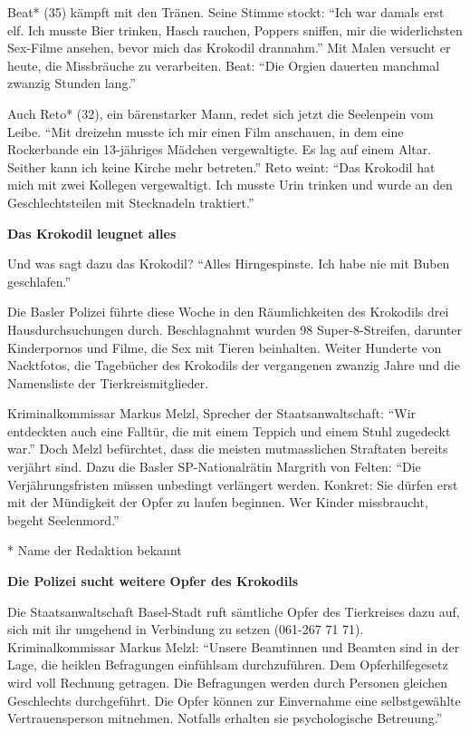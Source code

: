 Beat* (35) kämpft mit den Tränen. Seine Stimme stockt: ``Ich war damals
erst elf. Ich musste Bier trinken, Hasch rauchen, Poppers sniffen, mir
die widerlichsten Sex-Filme ansehen, bevor mich das Krokodil drannahm.''
Mit Malen versucht er heute, die Missbräuche zu verarbeiten. Beat: ``Die
Orgien dauerten manchmal zwanzig Stunden lang.''

Auch Reto* (32), ein bärenstarker Mann, redet sich jetzt die Seelenpein
vom Leibe. ``Mit dreizehn musste ich mir einen Film anschauen, in dem
eine Rockerbande ein 13-jähriges Mädchen vergewaltigte. Es lag auf einem
Altar. Seither kann ich keine Kirche mehr betreten.'' Reto weint: ``Das
Krokodil hat mich mit zwei Kollegen vergewaltigt. Ich musste Urin
trinken und wurde an den Geschlechtsteilen mit Stecknadeln traktiert.''

\textbf{Das Krokodil leugnet alles}

Und was sagt dazu das Krokodil? ``Alles Hirngespinste. Ich habe nie mit
Buben geschlafen.''

Die Basler Polizei führte diese Woche in den Räumlichkeiten des
Krokodils drei Hausdurchsuchungen durch. Beschlagnahmt wurden 98
Super-8-Streifen, darunter Kinderpornos und Filme, die Sex mit Tieren
beinhalten. Weiter Hunderte von Nacktfotos, die Tagebücher des Krokodils
der vergangenen zwanzig Jahre und die Namensliste der
Tierkreismitglieder.

Kriminalkommissar Markus Melzl, Sprecher der Staatsanwaltschaft: ``Wir
entdeckten auch eine Falltür, die mit einem Teppich und einem Stuhl
zugedeckt war.'' Doch Melzl befürchtet, dass die meisten mutmasslichen
Straftaten bereits verjährt sind. Dazu die Basler SP-Nationalrätin
Margrith von Felten: ``Die Verjährungsfristen müssen unbedingt
verlängert werden. Konkret: Sie dürfen erst mit der Mündigkeit der Opfer
zu laufen beginnen. Wer Kinder missbraucht, begeht Seelenmord.''

* Name der Redaktion bekannt

\textbf{Die Polizei sucht weitere Opfer des Krokodils}

Die Staatsanwaltschaft Basel-Stadt ruft sämtliche Opfer des Tierkreises
dazu auf, sich mit ihr umgehend in Verbindung zu setzen (061-267 71 71).
Kriminalkommissar Markus Melzl: ``Unsere Beamtinnen und Beamten sind in
der Lage, die heiklen Befragungen einfühlsam durchzuführen. Dem
Opferhilfegesetz wird voll Rechnung getragen. Die Befragungen werden
durch Personen gleichen Geschlechts durchgeführt. Die Opfer können zur
Ein­ver­nahme eine selbstgewählte Vertrauensperson mitnehmen. Notfalls
erhalten sie psychologische Betreuung.''

